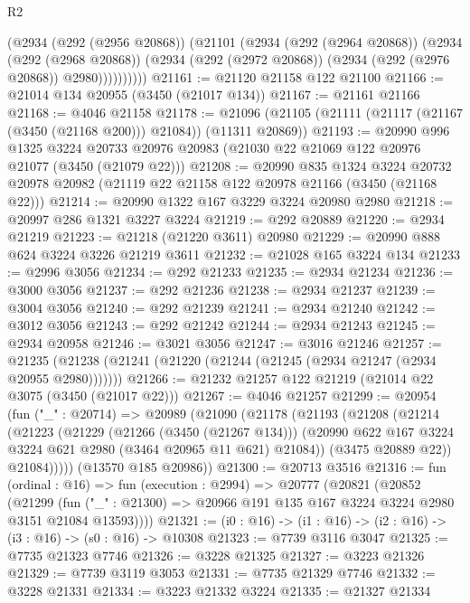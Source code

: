 \begin{lexlean}{R2}
\begin{coremodule}
            (@2934
              (@292 (@2956 @20868))
              (@21101
                (@2934
                  (@292 (@2964 @20868))
                  (@2934
                    (@292 (@2968 @20868))
                    (@2934 (@292 (@2972 @20868)) (@2934 (@292 (@2976 @20868)) @2980))))))))))
@21161 := @21120 @21158 @122 @21100
@21166 := @21014 @134 @20955 (@3450 (@21017 @134))
@21167 := @21161 @21166
@21168 := @4046 @21158
@21178 := @21096 (@21105 (@21111 (@21117 (@21167 (@3450 (@21168 @200))) @21084)) (@11311 @20869))
@21193 := @20990
    @996
    @1325
    @3224
    @20733
    @20976
    @20983
    (@21030 @22 @21069 @122 @20976 @21077 (@3450 (@21079 @22)))
@21208 := @20990
    @835
    @1324
    @3224
    @20732
    @20978
    @20982
    (@21119 @22 @21158 @122 @20978 @21166 (@3450 (@21168 @22)))
@21214 := @20990 @1322 @167 @3229 @3224 @20980 @2980
@21218 := @20997 @286 @1321 @3227 @3224
@21219 := @292 @20889
@21220 := @2934 @21219
@21223 := @21218 (@21220 @3611) @20980
@21229 := @20990 @888 @624 @3224 @3226 @21219 @3611
@21232 := @21028 @165 @3224 @134
@21233 := @2996 @3056
@21234 := @292 @21233
@21235 := @2934 @21234
@21236 := @3000 @3056
@21237 := @292 @21236
@21238 := @2934 @21237
@21239 := @3004 @3056
@21240 := @292 @21239
@21241 := @2934 @21240
@21242 := @3012 @3056
@21243 := @292 @21242
@21244 := @2934 @21243
@21245 := @2934 @20958
@21246 := @3021 @3056
@21247 := @3016 @21246
@21257 := @21235 (@21238 (@21241 (@21220 (@21244 (@21245 (@2934 @21247 (@2934 @20955 @2980)))))))
@21266 := @21232 @21257 @122 @21219 (@21014 @22 @3075 (@3450 (@21017 @22)))
@21267 := @4046 @21257
@21299 := @20954
    (fun ("_" : @20714) =>
    @20989
      (@21090
        (@21178
          (@21193
            (@21208
              (@21214
                (@21223
                  (@21229
                    (@21266 (@3450 (@21267 @134)))
                    (@20990 @622 @167 @3224 @3224 @621 @2980 (@3464 @20965 @11 @621) @21084))
                  (@3475 @20889 @22))
                @21084)))))
      (@13570 @185 @20986))
@21300 := @20713 @3516
@21316 := fun (ordinal : @16) =>
  fun (execution : @2994) =>
  @20777
    (@20821
      (@20852
        (@21299
          (fun ("_" : @21300) => @20966 @191 @135 @167 @3224 @3224 @2980 @3151 @21084 @13593))))
@21321 := (i0 : @16) -> (i1 : @16) -> (i2 : @16) -> (i3 : @16) -> (s0 : @16) -> @10308
@21323 := @7739 @3116 @3047
@21325 := @7735 @21323 @7746
@21326 := @3228 @21325
@21327 := @3223 @21326
@21329 := @7739 @3119 @3053
@21331 := @7735 @21329 @7746
@21332 := @3228 @21331
@21334 := @3223 @21332 @3224
@21335 := @21327 @21334

\end{coremodule}
\end{lexlean}
